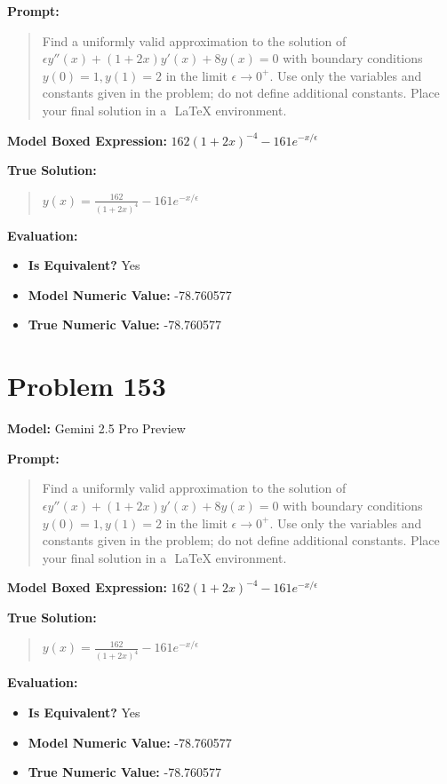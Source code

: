 \documentclass{article}
\begin{document}
{\textbf{Prompt:}
\begin{quote}
Find a uniformly valid approximation to the solution of $\epsilon y''(x)+(1+2x) y'(x)+8y(x)=0$ with boundary conditions $y(0)=1, y(1)=2$ in the limit $\epsilon \to 0^+$. Use only the variables and constants given in the problem; do not define additional constants. Place your final solution in a $\boxed{}$ LaTeX environment.
\end{quote}
\textbf{Model Boxed Expression:} $162(1+2x)^{-4} - 161e^{-x/\epsilon}$

\textbf{True Solution:}
\begin{quote}
$y(x) = \frac{162}{(1+2x)^4} - 161 e^{-x/ \epsilon}$
\end{quote}

\textbf{Evaluation:}
\begin{itemize}
\item \textbf{Is Equivalent?} Yes
\item \textbf{Model Numeric Value:} -78.760577
\item \textbf{True Numeric Value:} -78.760577
\end{itemize}
\vspace{1cm}
\section*{Problem 153}
\textbf{Model:} Gemini 2.5 Pro Preview

\textbf{Prompt:}
\begin{quote}
Find a uniformly valid approximation to the solution of $\epsilon y''(x)+(1+2x) y'(x)+8y(x)=0$ with boundary conditions $y(0)=1, y(1)=2$ in the limit $\epsilon \to 0^+$. Use only the variables and constants given in the problem; do not define additional constants. Place your final solution in a $\boxed{}$ LaTeX environment.
\end{quote}
\textbf{Model Boxed Expression:} $162(1+2x)^{-4} - 161e^{-x/\epsilon}$

\textbf{True Solution:}
\begin{quote}
$y(x) = \frac{162}{(1+2x)^4} - 161 e^{-x/ \epsilon}$
\end{quote}

\textbf{Evaluation:}
\begin{itemize}
\item \textbf{Is Equivalent?} Yes
\item \textbf{Model Numeric Value:} -78.760577
\item \textbf{True Numeric Value:} -78.760577
\end{itemize}
\vspace{1cm}
}
\end{document}
